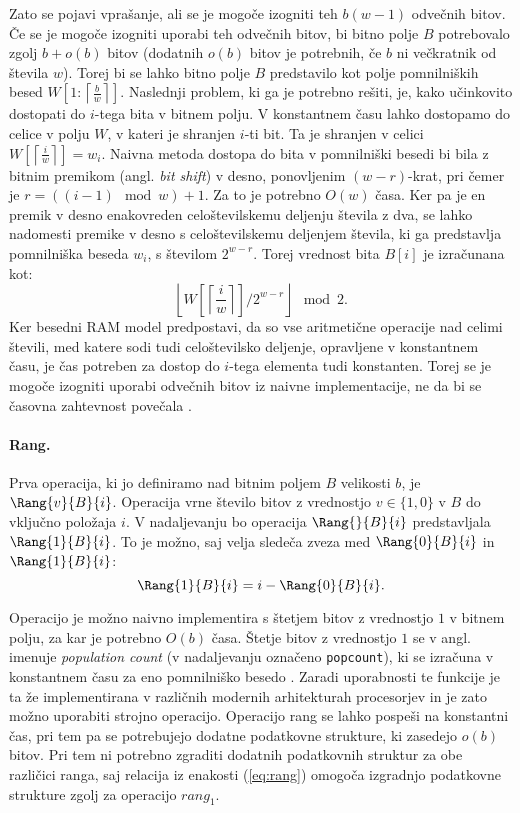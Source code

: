 Zato se pojavi vprašanje, ali se je mogoče izogniti teh $b(w-1)$ odvečnih bitov. Če se je mogoče izogniti uporabi teh odvečnih bitov, bi bitno polje $B$ potrebovalo zgolj $b+o(b)$ bitov (dodatnih $o(b)$ bitov je potrebnih, če $b$ ni večkratnik od števila $w$). Torej bi se lahko bitno polje $B$ predstavilo kot polje pomnilniških besed $W\left[1:\left\lceil\frac{b}{w}\right\rceil\right]$. Naslednji problem, ki ga je potrebno rešiti, je, kako učinkovito dostopati do $i$-tega bita v bitnem polju. V konstantnem času lahko dostopamo do celice v polju $W$, v kateri je shranjen $i$-ti bit. Ta je shranjen v celici $W\left[\left\lceil\frac{i}{w}\right\rceil\right]=w_i$. Naivna metoda dostopa do bita v pomnilniški besedi bi bila z bitnim premikom (angl. \textit{bit shift}) v desno, ponovljenim $(w-r)$-krat, pri čemer je $r=((i-1)\mod{w}) +1$. Za to je potrebno $O(w)$ časa. Ker pa je en premik v desno enakovreden celoštevilskemu deljenju števila z dva, se lahko nadomesti premike v desno s celoštevilskemu deljenjem števila, ki ga predstavlja pomnilniška beseda $w_i$, s številom $2^{w-r}$. Torej vrednost bita $B[i]$ je izračunana kot:
$$
    \left\lfloor W\left[\left\lceil\frac{i}{w}\right\rceil\right]/2^{w-r}\right\rfloor \mod{2}.
$$
Ker besedni RAM model predpostavi, da so vse aritmetične operacije nad celimi števili, med katere sodi tudi celoštevilsko deljenje, opravljene v konstantnem času, je čas potreben za dostop do $i$-tega elementa tudi konstanten. Torej se je mogoče izogniti uporabi odvečnih bitov iz naivne implementacije, ne da bi se časovna zahtevnost povečala \cite{Navarro2016}.

\paragraph{Rang.} 
Prva operacija, ki jo definiramo nad bitnim poljem $B$ velikosti $b$, je $\Rang{v}{B}{i}$. Operacija vrne število bitov z vrednostjo $v\in\{1,0\}$ v $B$ do vključno položaja $i$. V nadaljevanju bo operacija $\Rang{}{B}{i}$ predstavljala $\Rang{1}{B}{i}$. To je možno, saj velja sledeča zveza med $\Rang{0}{B}{i}$ in $\Rang{1}{B}{i}$:
\begin{equation}\label{eq:rang}
    \Rang{1}{B}{i}=i-\Rang{0}{B}{i}.
\end{equation}

Operacijo je možno naivno implementira s štetjem bitov z vrednostjo $1$ v bitnem polju, za kar je potrebno $O(b)$ časa. Štetje bitov z vrednostjo $1$ se v angl. imenuje \textit{population count} (v nadaljevanju označeno \texttt{popcount}), ki se izračuna v konstantnem času za eno pomnilniško besedo \cite{Brodnik1995,Knuth2011}. Zaradi uporabnosti te funkcije je ta že implementirana v različnih modernih arhitekturah procesorjev in je zato možno uporabiti strojno operacijo. Operacijo rang se lahko pospeši na konstantni čas, pri tem pa se potrebujejo dodatne podatkovne strukture, ki zasedejo $o(b)$ bitov. Pri tem ni potrebno zgraditi dodatnih podatkovnih struktur za obe različici ranga, saj relacija iz enakosti (\ref{eq:rang}) omogoča izgradnjo podatkovne strukture zgolj za operacijo $rang_1$.

